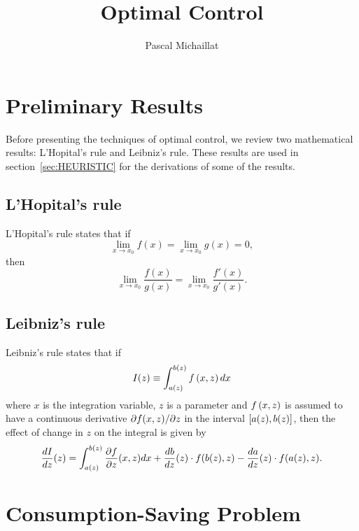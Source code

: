 \documentclass[letterpaper,12pt,leqno]{article}
\begin{document}
\title{Optimal Control}
\author{Pascal Michaillat}
\date{}

\begin{titlepage}
\maketitle
\tableofcontents
\end{titlepage}

\section{Preliminary Results}

Before presenting the techniques of optimal control, we review two mathematical results: L'Hopital's rule and Leibniz's rule. These results are used in section~\ref{sec:HEURISTIC} for the derivations of some of the results.

\subsection{L'Hopital's rule}

L'Hopital's rule states that if 
\begin{equation*}
\lim_{x\to x_{0}}f(x) =\lim_{x\to x_{0}}g(x) =0,
\end{equation*}
then 
\begin{equation*}
\lim_{x\to x_{0}}\frac{f(x)}{g(x)}=\lim_{x\to x_{0}}\frac{f'(x) }{g'(x)}.
\end{equation*}

\subsection{Leibniz's rule}

Leibniz's rule states that if
\begin{equation*}
I(z) \equiv \int_{a(z) }^{b(z)}f\left( x,z \right) dx
\end{equation*}
where $x$ is the integration variable, $z$ is a parameter and $f\left(  x,z \right)$ is assumed to have a continuous derivative $\partial f(x,z)/\partial z$ in the interval $\left[ a(z),b(z) \right]$, then the effect of change in $z$ on the integral is given by
\begin{equation*}
\frac{d I}{d z}(z) =\int_{a(z)}^{b(z)} \frac{\partial f}{\partial z}(x,z) dx+\frac{d b}{d z}(z) \cdot f( b(z),z) -\frac{d a}{d z}(z) \cdot f(a(z) ,z).
\end{equation*}

\section{Consumption-Saving Problem}
\end{document}
